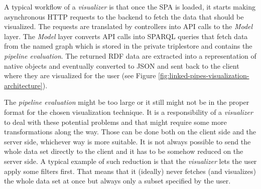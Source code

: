 A typical workflow of a \emph{visualizer} is that once the SPA is loaded, it starts making asynchronous HTTP requests to the backend to fetch the data that should be visualized. The requests are translated by controllers into API calls to the \emph{Model} layer.  The \emph{Model} layer converts API calls into SPARQL queries that fetch data from the named graph which is stored in the private triplestore and contains the \emph{pipeline evaluation}. The returned RDF data are extracted into a representation of native objects and eventually converted to JSON and sent back to the client where they are visualized for the user (see Figure \ref{fig:linked-pipes-visualization-architecture}).

The \emph{pipeline evaluation} might be too large or it still might not be in the proper format for the chosen visualization technique. It is a responsibility of a \emph{visualizer} to deal with these potential problems and that might require some more transformations along the way. Those can be done both on the client side and the server side, whichever way is more suitable. It is not always possible to send the whole data set directly to the client and it has to be somehow reduced on the server side. A typical example of such reduction is that the \emph{visualizer} lets the user apply some filters first. That means that it (ideally) never fetches (and visualizes) the whole data set at once but always only a subset specified by the user. 